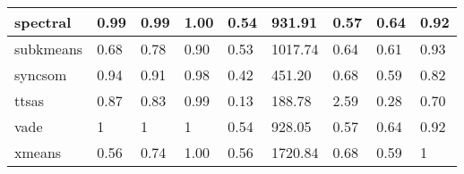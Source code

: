 \begin{table}[H]
\begin{tabular}{|l|l|l|l|l|l|l|l|l|}
\hline
spectral & 0.99 & 0.99 & 1.00 & 0.54 & 931.91 & 0.57 & 0.64 & 0.92 \\
\hline
subkmeans & 0.68 & 0.78 & 0.90 & 0.53 & 1017.74 & 0.64 & 0.61 & 0.93 \\
\hline
syncsom & 0.94 & 0.91 & 0.98 & 0.42 & 451.20 & 0.68 & 0.59 & 0.82 \\
\hline
ttsas & 0.87 & 0.83 & 0.99 & 0.13 & 188.78 & 2.59 & 0.28 & 0.70 \\
\hline
vade & 1 & 1 & 1 & 0.54 & 928.05 & 0.57 & 0.64 & 0.92 \\
\hline
xmeans & 0.56 & 0.74 & 1.00 & 0.56 & 1720.84 & 0.68 & 0.59 & 1 \\
\hline
\end{tabular}
\end{table}



